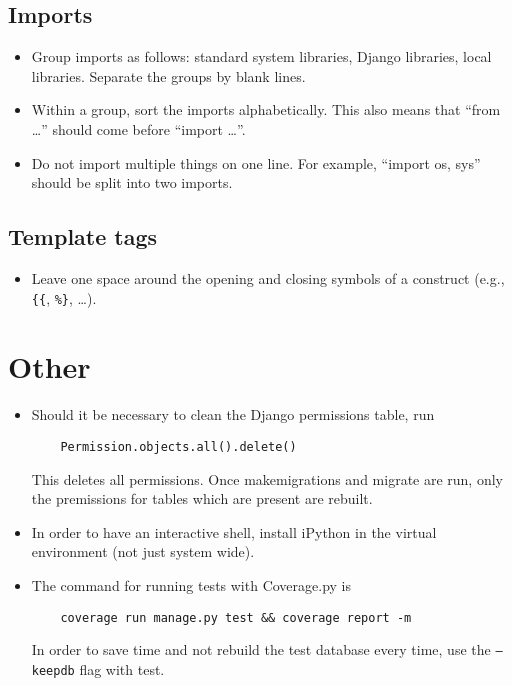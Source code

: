 \documentclass{article}
\begin{document}
\subsection{Imports}

\begin{itemize}
\item Group imports as follows: standard system libraries, Django libraries, local libraries. Separate the groups by blank lines.
\item Within a group, sort the imports alphabetically. This also means that ``from \ldots'' should come before ``import \ldots''.
\item Do not import multiple things on one line. For example, ``import os, sys'' should be split into two imports.
\end{itemize}

\subsection{Template tags}

\begin{itemize}
\item Leave one space around the opening and closing symbols of a construct (e.g., \verb+{{+, \verb+%}+, \ldots).
\end{itemize}

\section{Other}

\begin{itemize}
\item Should it be necessary to clean the Django permissions table, run
  \begin{lstlisting}
    Permission.objects.all().delete()
  \end{lstlisting}
  This deletes all permissions. Once makemigrations and migrate are run, only the premissions for tables which are present are rebuilt.
\item In order to have an interactive shell, install iPython in the virtual environment (not just system wide).
\item The command for running tests with Coverage.py is
  \begin{lstlisting}
    coverage run manage.py test && coverage report -m
  \end{lstlisting}
  In order to save time and not rebuild the test database every time, use the \texttt{--keepdb} flag with test.
\end{itemize}
\end{document}
